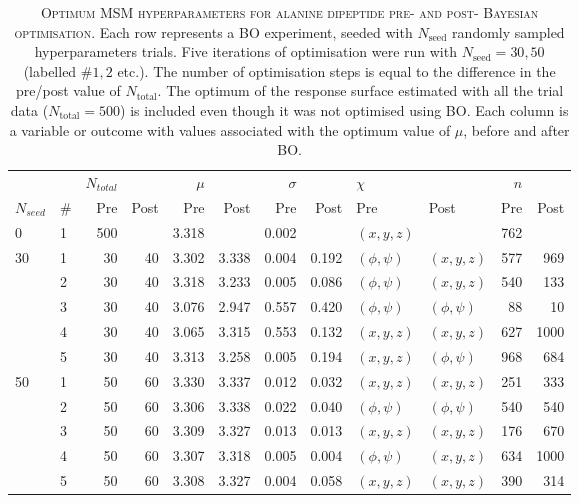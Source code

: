 \begin{table}
    \centering
    \caption[Optimum MSM hyperparameters for alanine dipeptide pre- and post- Bayesian optimisation]{\textsc{Optimum MSM hyperparameters for alanine dipeptide pre- and post- Bayesian optimisation}.  Each row represents a BO experiment, seeded with $N_{\mathrm{seed}}$ randomly sampled hyperparameters trials. Five iterations of optimisation were run with $N_{\mathrm{seed}}=30, 50$ (labelled $\# 1, 2$ etc.). The number of optimisation steps is equal to the difference in the pre/post value of $N_{\mathrm{total}}$.  The optimum of the response surface estimated with all the trial data ($N_{\mathrm{total}}=500$) is included even though it was not optimised using BO. Each column is a variable or outcome with values associated with the optimum value of $\mu$, before and after BO.  
    }
\begin{tabular}{llrrrrrrllrr}
\toprule
   &   & $N_{total}$ & & $\mu$ & & $\sigma$ & & $\chi$ &  & $n$ & \\
 $N_{seed}$  &   \#  &         Pre & Post &   Pre &  Post &      Pre &  Post &  Pre & Post & Pre & Post \\
\midrule
0  & 1 &         500 &      & 3.318 &       &    0.002 &       &     $(x, y, z)$ &              & 762 &      \\
\midrule
30 & 1 &          30 &   40 & 3.302 & 3.338 &    0.004 & 0.192 &  $(\phi, \psi)$ &     $(x, y, z)$ & 577 &  969 \\
   & 2 &          30 &   40 & 3.318 & 3.233 &    0.005 & 0.086 &  $(\phi, \psi)$ &     $(x, y, z)$ & 540 &  133 \\
   & 3 &          30 &   40 & 3.076 & 2.947 &    0.557 & 0.420 &  $(\phi, \psi)$ &  $(\phi, \psi)$ &  88 &   10 \\
   & 4 &          30 &   40 & 3.065 & 3.315 &    0.553 & 0.132 &     $(x, y, z)$ &     $(x, y, z)$ & 627 & 1000 \\
   & 5 &          30 &   40 & 3.313 & 3.258 &    0.005 & 0.194 &     $(x, y, z)$ &  $(\phi, \psi)$ & 968 &  684 \\
   \midrule
50 & 1 &          50 &   60 & 3.330 & 3.337 &    0.012 & 0.032 &     $(x, y, z)$ &     $(x, y, z)$ & 251 &  333 \\
   & 2 &          50 &   60 & 3.306 & 3.338 &    0.022 & 0.040 &  $(\phi, \psi)$ &  $(\phi, \psi)$ & 540 &  540 \\
   & 3 &          50 &   60 & 3.309 & 3.327 &    0.013 & 0.013 &     $(x, y, z)$ &     $(x, y, z)$ & 176 &  670 \\
   & 4 &          50 &   60 & 3.307 & 3.318 &    0.005 & 0.004 &  $(\phi, \psi)$ &     $(x, y, z)$ & 634 & 1000 \\
   & 5 &          50 &   60 & 3.308 & 3.327 &    0.004 & 0.058 &     $(x, y, z)$ &     $(x, y, z)$ & 390 &  314 \\
\bottomrule
\end{tabular}\label{tab:ala1_best_params}
\end{table}

